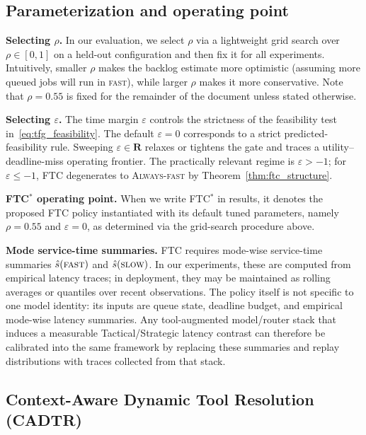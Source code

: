 \documentclass[preprint,12pt]{elsarticle}
\begin{document}
\subsection{Parameterization and operating point}
\label{sec:tfg_params}

\noindent\textbf{Selecting $\rho$.}
In our evaluation, we select $\rho$ via a lightweight grid search over $\rho\in[0,1]$ on a held-out configuration and then fix it for all experiments. Intuitively, smaller $\rho$ makes the backlog estimate more optimistic (assuming more queued jobs will run in \textsc{fast}), while larger $\rho$ makes it more conservative. Note that $\rho=0.55$ is fixed for the remainder of the document unless stated otherwise.

\noindent\textbf{Selecting $\varepsilon$.}
The time margin $\varepsilon$ controls the strictness of the feasibility test in~\eqref{eq:tfg_feasibility}. The default $\varepsilon=0$ corresponds to a strict predicted-feasibility rule. Sweeping $\varepsilon\in \mathbf{R}$ relaxes or tightens the gate and traces a utility--deadline-miss operating frontier. The practically relevant regime is $\varepsilon>-1$; for $\varepsilon\le -1$, FTC degenerates to \textsc{Always-fast} by Theorem~\ref{thm:ftc_structure}.

\noindent\textbf{FTC$^{\ast}$ operating point.}
When we write FTC$^{\ast}$ in results, it denotes the proposed FTC policy instantiated with its default tuned parameters, namely $\rho=0.55$ and $\varepsilon=0$, as determined via the grid-search procedure above.

\noindent\textbf{Mode service-time summaries.}
FTC requires mode-wise service-time summaries $\hat{s}(\textsc{fast})$ and $\hat{s}(\textsc{slow})$. In our experiments, these are computed from empirical latency traces; in deployment, they may be maintained as rolling averages or quantiles over recent observations. The policy itself is not specific to one model identity: its inputs are queue state, deadline budget, and empirical mode-wise latency summaries. Any tool-augmented model/router stack that induces a measurable Tactical/Strategic latency contrast can therefore be calibrated into the same framework by replacing these summaries and replay distributions with traces collected from that stack.

\subsection{Context-Aware Dynamic Tool Resolution (CADTR)}
\label{sec:cadtr}
\end{document}
